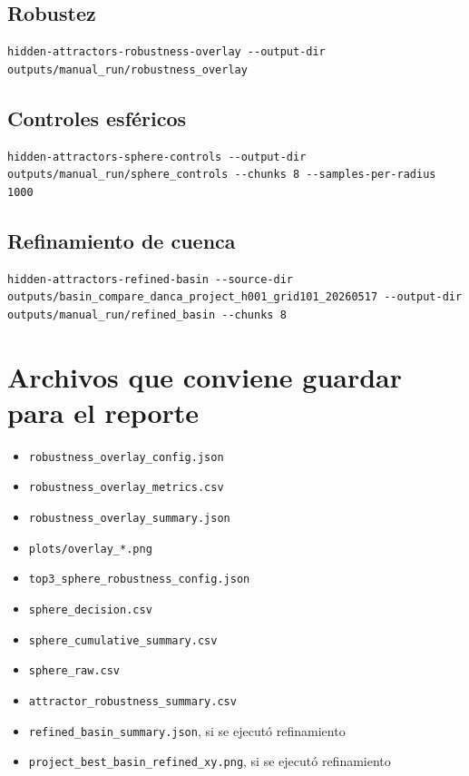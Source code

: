 \documentclass[11pt,letterpaper]{article}
\begin{document}
\subsection*{Robustez}

\begin{lstlisting}[style=terminal]
hidden-attractors-robustness-overlay --output-dir outputs/manual_run/robustness_overlay
\end{lstlisting}

\subsection*{Controles esféricos}

\begin{lstlisting}[style=terminal]
hidden-attractors-sphere-controls --output-dir outputs/manual_run/sphere_controls --chunks 8 --samples-per-radius 1000
\end{lstlisting}

\subsection*{Refinamiento de cuenca}

\begin{lstlisting}[style=terminal]
hidden-attractors-refined-basin --source-dir outputs/basin_compare_danca_project_h001_grid101_20260517 --output-dir outputs/manual_run/refined_basin --chunks 8
\end{lstlisting}

\section{Archivos que conviene guardar para el reporte}

\begin{itemize}
  \item \texttt{robustness\_overlay\_config.json}
  \item \texttt{robustness\_overlay\_metrics.csv}
  \item \texttt{robustness\_overlay\_summary.json}
  \item \texttt{plots/overlay\_*.png}
  \item \texttt{top3\_sphere\_robustness\_config.json}
  \item \texttt{sphere\_decision.csv}
  \item \texttt{sphere\_cumulative\_summary.csv}
  \item \texttt{sphere\_raw.csv}
  \item \texttt{attractor\_robustness\_summary.csv}
  \item \texttt{refined\_basin\_summary.json}, si se ejecutó refinamiento
  \item \texttt{project\_best\_basin\_refined\_xy.png}, si se ejecutó refinamiento
\end{itemize}
\end{document}
